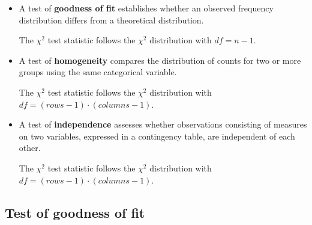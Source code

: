 \documentclass{article}
\begin{document}
\begin{itemize}
    \item A test of \textbf{goodness of fit} establishes whether an observed frequency 
    distribution differs from a theoretical distribution.
    
    The $\chi^2$ test statistic follows the $\chi^2$ distribution with $df=n-1$.
    \item A test of \textbf{homogeneity} compares the distribution of counts for 
    two or more groups using the same categorical variable.

    The $\chi^2$ test statistic follows the $\chi^2$ distribution with $df=(rows-1)\cdot(columns-1)$.
    \item A test of \textbf{independence} assesses whether observations consisting of 
    measures on two variables, expressed in a contingency table, are independent of each other.
    
    The $\chi^2$ test statistic follows the $\chi^2$ distribution with $df=(rows-1)\cdot(columns-1)$.
\end{itemize}

\subsection{Test of goodness of fit}
\end{document}
